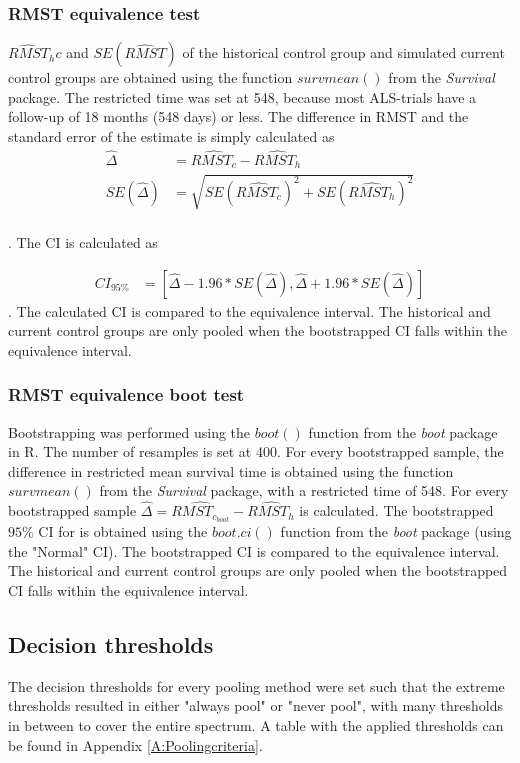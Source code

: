 \documentclass[Royal,sagev,times]{sagej}
\begin{document}
\subsubsection{RMST equivalence test}
$\hat{RMST}_hc$ and $SE(\hat{RMST})$ of the historical control group and simulated current control groups are obtained using the function $survmean()$ from the \textit{Survival} package.\cite{survivalpackage} The restricted time was set at 548, because most ALS-trials have a follow-up of 18 months (548 days) or less.\cite{van2019} The difference in RMST and the standard error of the estimate is simply calculated as
\begin{align*} \label{RMST CI}
\hat{\Delta} &= \hat{RMST_{c}} - \hat{RMST_{h}} \\
SE(\hat{\Delta}) &= \sqrt{SE(\hat{RMST_{c}})^2 + SE(\hat{RMST_{h}})^2}  \\
\end{align*}

.\cite{royston2013} The CI is calculated as

\begin{align*}
CI_{95\%} &= [\hat{\Delta}-1.96*SE(\hat{\Delta}) , \hat{\Delta}+1.96*SE(\hat{\Delta})]
\end{align*} .\cite{royston2013}
The calculated CI is compared to the equivalence interval. The historical and current control groups are only pooled when the bootstrapped CI falls within the equivalence interval.

\subsubsection{RMST equivalence boot test}
Bootstrapping was performed using the $boot()$ function from the \textit{boot} package in R.\cite{bootpackage} The number of resamples is set at 400. For every bootstrapped sample, the difference in restricted mean survival time is obtained using the function $survmean()$ from the \textit{Survival} package, with a restricted time of 548. For every bootstrapped sample $\hat{\Delta} = \hat{RMST_{c_{boot}}} - \hat{RMST_{h}}$ is calculated. The bootstrapped $95\%$ CI for \hat{$\Delta$} is obtained using the $boot.ci()$ function from the \textit{boot} package (using the "Normal" CI). 
The bootstrapped CI is compared to the equivalence interval. The historical and current control groups are only pooled when the bootstrapped CI falls within the equivalence interval.

\subsection{Decision thresholds}
The decision thresholds for every pooling method were set such that the extreme thresholds resulted in either "always pool" or "never pool", with many thresholds in between to cover the entire spectrum. A table with the applied thresholds can be found in Appendix \ref{A:Poolingcriteria}.
\end{document}
